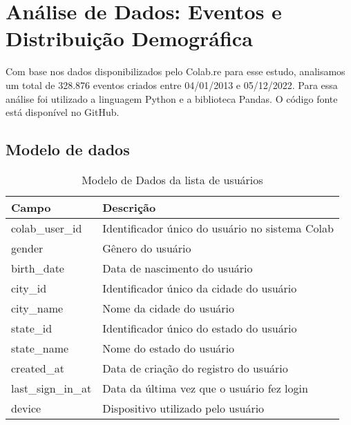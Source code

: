 \section{Análise de Dados: Eventos e Distribuição Demográfica}

Com base nos dados disponibilizados pelo Colab.re para esse estudo, analisamos um total de 328.876 eventos criados entre 04/01/2013 e 05/12/2022. Para essa análise foi utilizado a linguagem Python e a biblioteca Pandas. O código fonte está disponível no GitHub.

\subsection*{Modelo de dados}

\begin{table}[ht]
	\centering
	\caption{Modelo de Dados da lista de usuários}
	\label{tab:user_model}
	\begin{tabularx}{\textwidth}{|l|X|}
		\hline
		\textbf{Campo}     & \textbf{Descrição}                              \\
		\hline
		colab\_user\_id    & Identificador único do usuário no sistema Colab \\
		gender             & Gênero do usuário                               \\
		birth\_date        & Data de nascimento do usuário                   \\
		city\_id           & Identificador único da cidade do usuário        \\
		city\_name         & Nome da cidade do usuário                       \\
		state\_id          & Identificador único do estado do usuário        \\
		state\_name        & Nome do estado do usuário                       \\
		created\_at        & Data de criação do registro do usuário          \\
		last\_sign\_in\_at & Data da última vez que o usuário fez login      \\
		device             & Dispositivo utilizado pelo usuário              \\
		\hline
	\end{tabularx}
\end{table}


